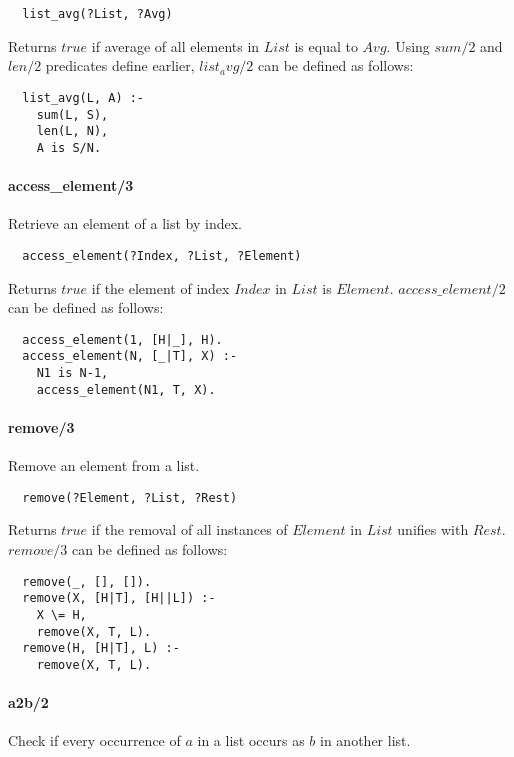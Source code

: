 \documentclass{article}
\begin{document}
\begin{multicols}{2}
  \begin{lstlisting}
  list_avg(?List, ?Avg)
  \end{lstlisting} 
  
  Returns $true$ if average of all elements in $List$ is equal to $Avg$. Using $sum/2$ and $len/2$ predicates define earlier, $list_avg/2$ can be defined as follows:

  \begin{lstlisting}
  list_avg(L, A) :-
    sum(L, S),
    len(L, N),
    A is S/N.
  \end{lstlisting}
 
  \paragraph{access\_element/3} Retrieve an element of a list by index.
  
  \begin{lstlisting}
  access_element(?Index, ?List, ?Element)
  \end{lstlisting}
  
  Returns $true$ if the element of index $Index$ in $List$ is $Element$. $access\_element/2$ can be defined as follows:

  \begin{lstlisting}
  access_element(1, [H|_], H).
  access_element(N, [_|T], X) :-
    N1 is N-1,
    access_element(N1, T, X).
  \end{lstlisting}
  
  \paragraph{remove/3} Remove an element from a list.
  
  \begin{lstlisting}
  remove(?Element, ?List, ?Rest)
  \end{lstlisting}
  
  Returns $true$ if the removal of all instances of $Element$ in $List$ unifies with $Rest$. $remove/3$ can be defined as follows:

  \begin{lstlisting}
  remove(_, [], []).
  remove(X, [H|T], [H||L]) :-
    X \= H,
    remove(X, T, L).
  remove(H, [H|T], L) :-
    remove(X, T, L).
  \end{lstlisting}  
  
  \paragraph{a2b/2} Check if every occurrence of $a$ in a list occurs as $b$ in another list.
  

\end{multicols}
\end{document}
